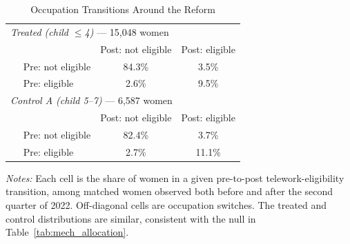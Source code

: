 \begin{table}[H]\centering
\caption{Occupation Transitions Around the Reform}
\label{tab:occ_transition}\small
\begin{tabular}{lcc}
\toprule
\multicolumn{3}{l}{\textit{Treated (child $\leq$4)} --- 15,048 women} \\
 & Post: not eligible & Post: eligible \\
$\quad$ Pre: not eligible & 84.3\% & 3.5\% \\
$\quad$ Pre: eligible & 2.6\% & 9.5\% \\
\midrule
\multicolumn{3}{l}{\textit{Control A (child 5--7)} --- 6,587 women} \\
 & Post: not eligible & Post: eligible \\
$\quad$ Pre: not eligible & 82.4\% & 3.7\% \\
$\quad$ Pre: eligible & 2.7\% & 11.1\% \\
\bottomrule\end{tabular}
\par\vspace{3pt}\footnotesize\raggedright \textit{Notes:} Each cell is the share of women in a given pre-to-post telework-eligibility transition, among matched women observed both before and after the second quarter of 2022. Off-diagonal cells are occupation switches. The treated and control distributions are similar, consistent with the null in Table~\ref{tab:mech_allocation}.
\end{table}
